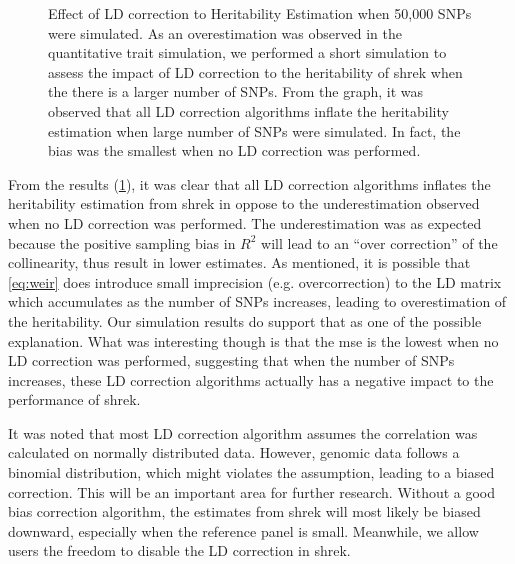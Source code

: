 \begin{figure}[t]
{			\label{fig:bigvarLDCor}
		}
		\caption[Effect of LD correction to Heritability Estimation with 50,000 SNPs]
		{Effect of LD correction to Heritability Estimation when 50,000 \glspl{SNP} were simulated.
			As an overestimation was observed in the quantitative trait simulation, we performed a short simulation to assess the impact of \gls{LD} correction to the heritability of \gls{shrek} when the there is a larger number of \glspl{SNP}.
			From the graph, it was observed that all \gls{LD} correction algorithms inflate the heritability estimation when large number of \glspl{SNP} were simulated.
			In fact, the bias was the smallest when no \gls{LD} correction was performed. 
		} 
		\label{fig:ldCorBigCom}
	\end{figure}
	
	From the results (\cref{fig:ldCorBigCom}), it was clear that all \gls{LD} correction algorithms inflates the heritability estimation from \gls{shrek} in oppose to the underestimation observed when no \gls{LD} correction was performed.
	The underestimation was as expected because the positive sampling bias in $R^2$ will lead to an ``over correction'' of the collinearity, thus result in lower estimates.
	As mentioned, it is possible that \cref{eq:weir} does introduce small imprecision (e.g. overcorrection) to the \gls{LD} matrix which accumulates as the number of \glspl{SNP} increases, leading to overestimation of the heritability.
	Our simulation results do support that as one of the possible explanation. 
	What was interesting though is that the \gls{mse} is the lowest when no \gls{LD} correction was performed, suggesting that when the number of \glspl{SNP} increases, these \gls{LD} correction algorithms actually has a negative impact to the performance of \gls{shrek}.
	
	It was noted that most \gls{LD} correction algorithm assumes the correlation was calculated on normally distributed data. 
	However, genomic data follows a binomial distribution, which might violates the assumption,  leading to a biased correction.
	This will be an important area for further research.
	Without a good bias correction algorithm, the estimates from \gls{shrek} will most likely be biased downward, especially when the reference panel is small.
	Meanwhile, we allow users the freedom to disable the \gls{LD} correction in \gls{shrek}.
	
